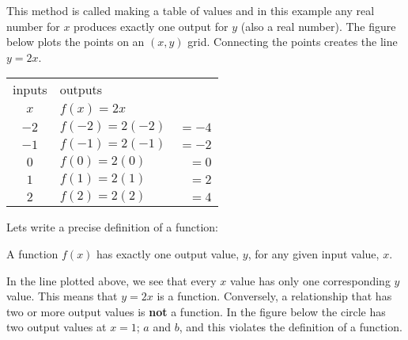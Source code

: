 This method is called making a table of values and in this example any real number for $x$ produces exactly one output for $y$ (also a real number). The figure below plots the points on an $(x,y)$ grid. Connecting the points creates the line $y=2x$.

\begin{multicols}{2}
\begin{center}
\begin{tabular}{clr}  
	\toprule
	inputs&outputs&\\
$x$&$f(x)=2x$& \\
	\midrule
	$-2$    & $f(-2)=2(-2)$&$=-4$\\
	\midrule
$-1$ & $f(-1)=2(-1)$&$=-2$ \\
\midrule
$0$ & $f(0)=2(0)$&$=0$ \\
\midrule
$1$ & $f(1)=2(1)$&$=2$ \\
\midrule
$2$ & $f(2)=2(2)$&$=4$ \\
	\bottomrule
\end{tabular}
\end{center}
\columnbreak
\begin{center}
\end{center}
\end{multicols}
\vspace{-0.5cm}
Lets write a precise definition of a function:
\begin{tcolorbox}\begin{center}
	A function $f(x)$ has exactly one output value, $y$, for any given input value, $x$.
\end{center}\end{tcolorbox}
In the line plotted above, we see that every $x$ value has only one corresponding $y$ value. This means that $y=2x$ is a function. Conversely, a relationship that has two or more output values is \textbf{not} a function. In the figure below the circle has two output values at $x=1$; $a$ and $b$, and this violates the definition of a function.

